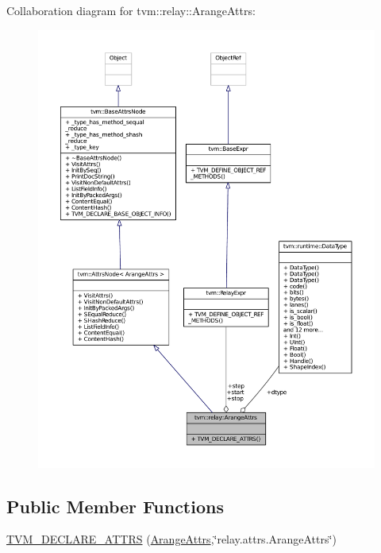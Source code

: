 Collaboration diagram for tvm\+:\+:relay\+:\+:Arange\+Attrs\+:
\nopagebreak
\begin{figure}[H]
\begin{center}
\leavevmode
\includegraphics[width=350pt]{structtvm_1_1relay_1_1ArangeAttrs__coll__graph}
\end{center}
\end{figure}
\subsection*{Public Member Functions}
\begin{DoxyCompactItemize}
\item 
\hyperlink{structtvm_1_1relay_1_1ArangeAttrs_ae6c7574b378953c4491e9ac6c618d43c}{T\+V\+M\+\_\+\+D\+E\+C\+L\+A\+R\+E\+\_\+\+A\+T\+T\+RS} (\hyperlink{structtvm_1_1relay_1_1ArangeAttrs}{Arange\+Attrs},\char`\"{}relay.\+attrs.\+Arange\+Attrs\char`\"{})
\end{DoxyCompactItemize}
